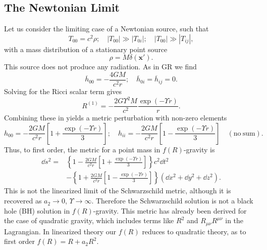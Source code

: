 \subsection{The Newtonian Limit}

Let us consider the limiting case of a Newtonian source, such that
\begin{equation}
T_{00} = c^2\rho; \quad |T_{00}| \gg |T_{0i}|; \quad |T_{00}| \gg |T_{ij}|,
\end{equation}
with a mass distribution of a stationary point source
\begin{equation}
\rho = M\delta(\boldsymbol{x'}).
\end{equation}
This source does not produce any radiation. As in GR we find
\begin{equation}
\overline{h}_{00} = -\frac{4GM}{c^2r}; \quad \overline{h}_{0i} = \overline{h}_{ij} = 0.
\end{equation}
Solving for the Ricci scalar term gives
\begin{equation}
R^{(1)} = -\frac{2 G \Upsilon^2 M}{c^2}\frac{\exp(- \Upsilon r)}{r}.
\end{equation}
Combining these in  yields a metric perturbation with non-zero elements 
\begin{equation}
h_{00} = -\frac{2GM}{c^2r}\left[1 + \frac{\exp(- \Upsilon r)}{3}\right]; \quad h_{ii} = -\frac{2GM}{c^2r}\left[1 - \frac{\exp(- \Upsilon r)}{3}\right] \quad \mathrm{(no\: sum)}.
\end{equation}
Thus, to first order, the metric for a point mass in $f(R)$-gravity is\cite{Capozziello2009a, Naf2010}
\begin{align}
\dd s^2 = & {} \left\{1-\frac{2GM}{c^2r}\left[1 + \frac{\exp(- \Upsilon r)}{3}\right]\right\}c^2\dd t^2 \nonumber \\
 & - {} \left\{1+\frac{2GM}{c^2r}\left[1 - \frac{\exp(- \Upsilon r)}{3}\right]\right\}\left(\dd x^2 + \dd y^2 + \dd z^2\right).
\label{eq:f(R)_Schw}
\end{align}
This is not the linearized limit of the Schwarzschild metric, although it is recovered as $a_2 \rightarrow 0$, $\Upsilon \rightarrow \infty$. Therefore the Schwarzschild solution is not a black hole (BH) solution in $f(R)$-gravity\cite{Chiba2007a}. This metric has already been derived for the case of quadratic gravity, which includes terms like $R^2$ and $R_{\mu\nu}R^{\mu\nu}$ in the Lagrangian\cite{Pechlaner1966, Stelle1978, Schmidt1986, Teyssandier1990}. In linearized theory our $f(R)$ reduces to quadratic theory, as to first order $f(R) = R + a_2 R^2$.

